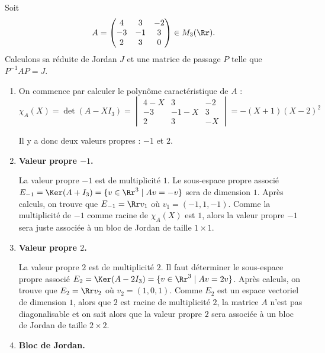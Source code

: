 \documentclass[12pt, class=report,crop=false]{standalone}
\begin{document}
  


\begin{exemple}
Soit 
$$A = \begin{pmatrix}
4 & 3 & -2 \\
-3 & -1 & 3 \\
2 & 3 & 0
\end{pmatrix}
\in M_3(\Rr).$$
Calculons sa réduite de Jordan $J$ et une matrice de passage $P$ telle que 
$P^{-1}AP = J$.

\begin{enumerate}
  \item On commence par calculer le polynôme caractéristique de $A$ :
  $$\chi_A(X) = \det(A-XI_3) = 
  \begin{vmatrix}
  4-X & 3 & -2 \\
  -3 & -1-X & 3 \\
  2 & 3 & -X  
  \end{vmatrix}
  = - (X+1)(X-2)^2$$
  
  Il y a donc deux valeurs propres : $-1$ et $2$.
  
  \item \textbf{Valeur propre $-1$.}
  
  La valeur propre $-1$ est de multiplicité $1$. Le sous-espace propre associé $E_{-1} = \Ker(A+I_3) = \{ v \in \Rr^3 \mid Av = -v\}$ sera de dimension $1$. Après calculs, on trouve que $E_{-1} = \Rr v_1$ où
  $v_1 = (-1,1,-1)$. Comme la multiplicité de $-1$ comme racine de $\chi_A(X)$ est $1$, alors
  la valeur propre $-1$ sera juste associée à un bloc de Jordan de taille $1\times 1$.
  
  \item \textbf{Valeur propre $2$.}
  
  La valeur propre $2$ est de multiplicité $2$. Il faut déterminer le sous-espace propre associé $E_{2} = \Ker(A-2I_3) = \{ v \in \Rr^3 \mid Av = 2v\}$. 
  Après calculs, on trouve que $E_{2} = \Rr v_2$ où
  $v_2 = (1,0,1)$. Comme $E_2$ est un espace vectoriel de dimension $1$, alors que $2$ est racine de multiplicité $2$, la matrice $A$ n'est pas diagonalisable et on sait alors que la valeur propre $2$ sera associée à un bloc de Jordan de taille $2\times 2$.

  
  \item \textbf{Bloc de Jordan.}


\end{enumerate}
\end{exemple}
\end{document}
